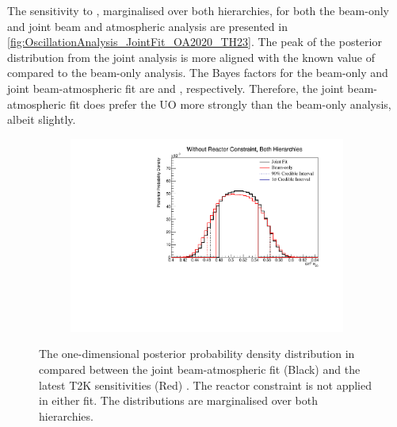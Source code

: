 The sensitivity to , marginalised over both hierarchies, for both the beam-only and joint beam and atmospheric analysis are presented in \autoref{fig:OscillationAnalysis_JointFit_OA2020_TH23}. The peak of the posterior distribution from the joint analysis is more aligned with the known value of  compared to the beam-only analysis.
The Bayes factors for the beam-only and joint beam-atmospheric fit are  and , respectively. Therefore, the joint beam-atmospheric fit does prefer the UO more strongly than the beam-only analysis, albeit slightly.

\begin{figure}[h]
  \begin{subfigure}[t]{0.98\textwidth}
    \includegraphics[width=\textwidth, trim={0mm 0mm 0mm 0mm}, clip,page=1]{Figures/OA/JointFit_OA2020_Comp/ContourComparison_1D_th23_BH_2_woRC_UnSmeared_CredibleInterval.pdf}
  \end{subfigure}
  \caption{The one-dimensional posterior probability density distribution in  compared between the joint beam-atmospheric fit (Black) and the latest T2K sensitivities (Red) \cite{Dunne2020-uf, t2k_tn_393}. The reactor constraint is not applied in either fit. The distributions are marginalised over both hierarchies.}
  \label{fig:OscillationAnalysis_JointFit_OA2020_TH23}
\end{figure}

